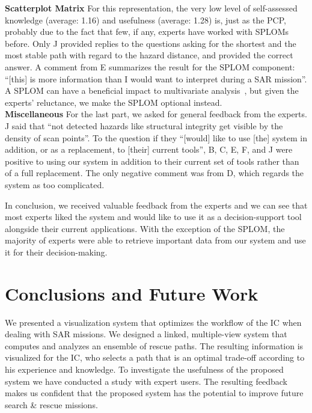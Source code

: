 \documentclass{egpubl}
\begin{document}
\textbf{Scatterplot Matrix} For this representation, the very low level of self-assessed knowledge (average: 1.16) and usefulness (average: 1.28) is, just as the PCP, probably due to the fact that few, if any, experts have worked with SPLOMs before. Only J provided replies to the questions asking for the shortest and the most stable path with regard to the hazard distance, and provided the correct answer. A comment from E summarizes the result for the SPLOM component: ``[this] is more information than I would want to interpret during a SAR mission''. A SPLOM can have a beneficial impact to multivariate analysis~\cite{6064985}, but given the experts' reluctance, we make the SPLOM optional instead.\\
\textbf{Miscellaneous} For the last part, we asked for general feedback from the experts. J said that ``not detected hazards like structural integrity get visible by the density of scan points''. To the question if they ``[would] like to use [the] system in addition, or as a replacement, to [their] current tools'', B, C, E, F, and J were positive to using our system in addition to their current set of tools rather than of a full replacement. The only negative comment was from D, which regards the system as too complicated. 

In conclusion, we received valuable feedback from the experts and we can see that most experts liked the system and would like to use it as a decision-support tool alongside their current applications. With the exception of the SPLOM, the majority of experts were able to retrieve important data from our system and use it for their decision-making.


\section{Conclusions and Future Work} \label{sec:conclusion}
We presented a visualization system that optimizes the workflow of the IC when dealing with SAR missions. We designed a linked, multiple-view system that computes and analyzes an ensemble of rescue paths. The resulting information is visualized for the IC, who selects a path that is an optimal trade-off according to his experience and knowledge. To investigate the usefulness of the proposed system we have conducted a study with expert users. The resulting feedback makes us confident that the proposed system has the potential to improve future search \& rescue missions.
\end{document}
